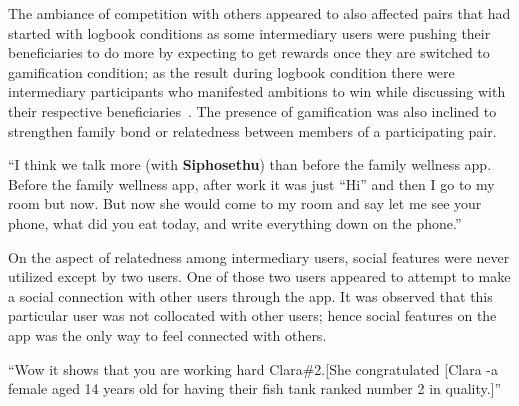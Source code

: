 The ambiance of competition with others appeared to also affected pairs that had started with logbook conditions as some intermediary users were pushing their beneficiaries to do more by expecting to get rewards once they are switched to gamification condition; as the result during logbook condition there were intermediary participants who manifested ambitions to win while discussing with their respective beneficiaries~\citep{katule2016family}. The presence of gamification was also inclined to strengthen family bond or relatedness between members of a participating pair.

 {``I think we talk more (with \textbf{Siphosethu}) than before the family wellness app. Before the family wellness app, after work it was just ``Hi'' and then I go to my room but now. But now she would come to my room  and say let me see your phone,  what did you eat today,  and write everything down on the phone.''} 

On the aspect of relatedness among intermediary users, social features were never utilized except by two users. One of those two users appeared to attempt to make a social connection with other users through the app. It was observed that this particular user was not collocated with other users; hence social features on the app was the only way to feel connected with others.  

 {``Wow it shows that you are working hard  Clara\#2.[She congratulated [Clara -a female aged 14 years old for having their fish tank ranked number 2 in quality.]''} 


